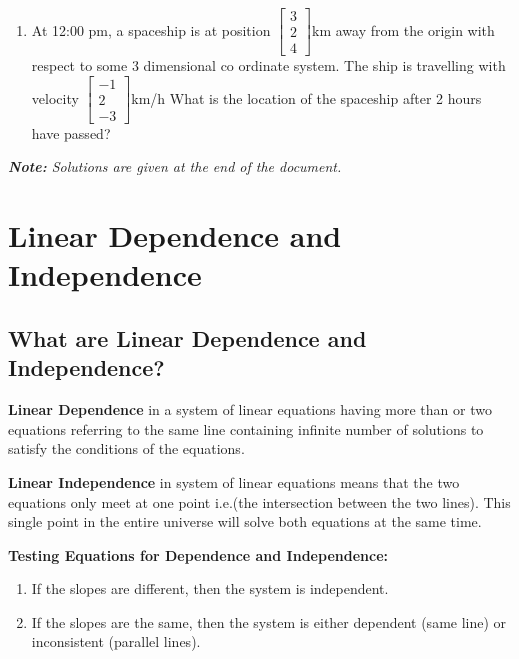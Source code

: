 \documentclass[a4paper,12pt]{article}
\begin{document}
\begin{flushleft}
\begin{flushleft}
\begin{flushleft}
\begin{enumerate}
\item At 12:00 pm, a spaceship is at position $
\begin{bmatrix}
3\\
2\\
4
\end{bmatrix}
$km away from the origin with respect to some 3 dimensional co ordinate system. The ship is travelling with velocity $
\begin{bmatrix}
-1\\
2\\
-3
\end{bmatrix}
$km/h What is the location of the spaceship after 2 hours have passed?
\newline


\end{enumerate}


\textit{\textbf{Note:} Solutions are given at the end of the document.}

\end{flushleft}

\section{Linear Dependence and Independence}
\begin{flushleft}

\subsection{What are Linear Dependence and Independence?}
\textbf{Linear Dependence} in a system of linear equations having more than or two equations referring to the same line containing infinite number of solutions to satisfy the conditions of the equations.
\newline
\newline

\textbf{Linear Independence} in system of linear equations means that the two equations only meet at one point i.e.(the intersection between the two lines). This single point in the entire universe will solve both equations at the same time. 
\newline
\newline

\textbf{Testing Equations for Dependence and Independence:}

\begin{enumerate}
    \item If the slopes are different, then the system is independent.
    \item If the slopes are the same, then the system is either dependent (same line) or inconsistent (parallel lines).
\end{enumerate}


\end{flushleft}
\end{flushleft}
\end{flushleft}
\end{document}
